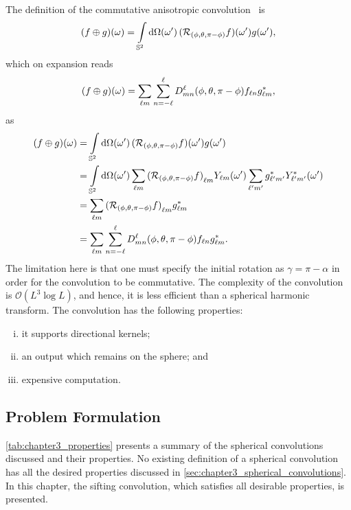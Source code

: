The definition of the commutative anisotropic convolution~\cite{Sadeghi2012,Khalid2012} is
%
\begin{equation}
	\pixel{(f \oplus g)}
	= \integrateSphere{\omega'} \pixel[']{(\rotation{(\phi,\theta,\pi-\phi)}f)} \pixel[']{g},
\end{equation}
%
which on expansion reads
%
\begin{equation}
	\pixel{(f \oplus g)}
	= \harmonicSum \wignerSum \wigner{\ell}{m}{n}(\phi,\theta,\pi-\phi) f_{\ell n} \conj{\harmonic{g}},
\end{equation}
%
as
%
\begin{align}
	\pixel{(f \oplus g)}
	 & = \integrateSphere{\omega'} \pixel[']{(\rotation{(\phi,\theta,\pi-\phi)}f)} \pixel[']{g} \nonumber{}                                                                                                  \\
	 & = \integrateSphere{\omega'} \harmonicSum \harmonic{(\rotation{(\phi,\theta,\pi-\phi)}f)} \pixel[']{\harmonic{Y}} \harmonicSum['] \conj{\harmonic[']{g}} \pixel[']{\conj{\harmonic[']{Y}}} \nonumber{} \\
	 & = \harmonicSum \harmonic{(\rotation{(\phi,\theta,\pi-\phi)}f)} \conj{\harmonic{g}} \nonumber{}                                                                                                        \\
	 & = \harmonicSum \wignerSum \wigner{\ell}{m}{n}(\phi,\theta,\pi-\phi) f_{\ell n} \conj{\harmonic{g}}.
\end{align}
%
The limitation here is that one must specify the initial rotation as \({\gamma=\pi-\alpha}\) in order for the convolution to be commutative.
The complexity of the convolution is \(\mathcal{O}(L^{3}\log{L})\), and hence, it is less efficient than a spherical harmonic transform.
The convolution has the following properties:
%
\begin{enumerate}[(i),nosep,left=\parindent]
	\item it supports directional kernels;
	\item an output which remains on the sphere; and
	\item expensive computation.
\end{enumerate}

\subsection{Problem Formulation}

\cref{tab:chapter3_properties} presents a summary of the spherical convolutions discussed and their properties.
No existing definition of a spherical convolution has all the desired properties discussed in \cref{sec:chapter3_spherical_convolutions}.
In this chapter, the sifting convolution, which satisfies all desirable properties, is presented.


